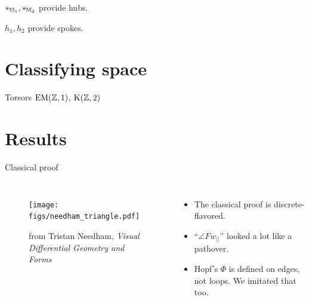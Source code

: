 \documentclass[14pt,aspectratio=169,compress]{beamer}
\begin{document}
\begin{frame}


\( *_{\mathbb{M}_1}, *_{\mathbb{M}_2} \) provide \alert{hubs}.

\( h_1, h_2 \) provide \alert{spokes}.
\end{frame}

\section{Classifying space}

\begin{frame}{Torsors}
\( \mathrm{EM}(\mathbb{Z},1) \), \( \mathrm{K}(\mathbb{Z},2) \)
\end{frame}

\section{Results}
\begin{frame}{Classical proof}
\begin{columns}
\begin{figure}
\texttt{[image: figs/needham\_triangle.pdf]}
\caption{from Tristan Needham, \emph{Visual Differential Geometry and Forms}}
\end{figure}
\begin{itemize}
\item The classical proof is discrete-flavored.
\item ``\( \angle Fw_{||} \)'' looked a lot like a pathover.
\item Hopf's \( \Phi \) is defined on edges, not loops. We imitated that too.
\end{itemize}
\end{columns}
\end{frame}
\end{document}
